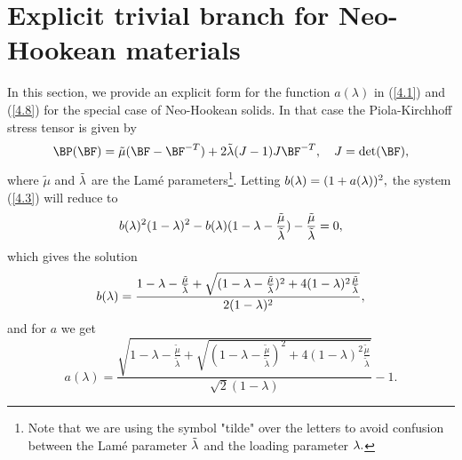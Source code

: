 
\section{Explicit trivial branch for Neo-Hookean materials} 
\setcounter{equation}{0}
In this section, we provide an explicit form for the function $a(\lambda)$ in (\ref{4.1}) and (\ref{4.8}) for the special case of Neo-Hookean solids. 
In that case the Piola-Kirchhoff stress tensor is given by  
$$\BP(\BF)=\tilde \mu(\BF-\BF^{-T})+ 2\tilde{\lambda}(J-1)J\BF^{-T},\quad J=\det(\BF),$$
where $\tilde \mu$ and $\tilde{\lambda}$ are the Lam\'e parameters\footnote{Note that we are using the symbol "tilde" over the letters to avoid confusion between the Lam\'e parameter $\tilde{\lambda}$ and the loading parameter $\lambda.$}. Letting $b(\lambda)=(1+a(\lambda))^2,$ the system (\ref{4.3}) will reduce to 
$$b(\lambda)^2(1-\lambda)^2-b(\lambda)(1-\lambda-\frac{\tilde\mu}{\tilde{\lambda}})-\frac{\tilde\mu}{\tilde{\lambda}}=0,$$
which gives the solution
$$b(\lambda)=\frac{1-\lambda-\frac{\tilde\mu}{\tilde{\lambda}}+\sqrt{(1-\lambda-\frac{\tilde\mu}{\tilde{\lambda}})^2+4(1-\lambda)^2\frac{\tilde\mu}{\tilde{\lambda}}}
}{2(1-\lambda)^2},$$
and for $a$ we get
$$a(\lambda)=\frac{\sqrt{1-\lambda-\frac{\tilde\mu}{\tilde{\lambda}}+\sqrt{(1-\lambda-\frac{\tilde\mu}{\tilde{\lambda}})^2
+4(1-\lambda)^2\frac{\tilde\mu}{\tilde{\lambda}}}}}{\sqrt{2}(1-\lambda)}-1.
$$
